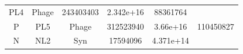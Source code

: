 \documentclass[]{article}
\begin{document}
\begin{longtable}[]{@{}cccccc@{}}
\begin{minipage}[t]{0.07\columnwidth}
PL4
\strut\end{minipage} &
\begin{minipage}[t]{0.12\columnwidth}\centering\strut
Phage
\strut\end{minipage} &
\begin{minipage}[t]{0.12\columnwidth}\centering\strut
243403403
\strut\end{minipage} &
\begin{minipage}[t]{0.12\columnwidth}\centering\strut
2.342e+16
\strut\end{minipage} &
\begin{minipage}[t]{0.12\columnwidth}\centering\strut
88361764
\strut\end{minipage}\tabularnewline
\begin{minipage}[t]{0.07\columnwidth}\centering\strut
P
\strut\end{minipage} &
\begin{minipage}[t]{0.07\columnwidth}\centering\strut
PL5
\strut\end{minipage} &
\begin{minipage}[t]{0.12\columnwidth}\centering\strut
Phage
\strut\end{minipage} &
\begin{minipage}[t]{0.12\columnwidth}\centering\strut
312523940
\strut\end{minipage} &
\begin{minipage}[t]{0.12\columnwidth}\centering\strut
3.66e+16
\strut\end{minipage} &
\begin{minipage}[t]{0.12\columnwidth}\centering\strut
110450827
\strut\end{minipage}\tabularnewline
\begin{minipage}[t]{0.07\columnwidth}\centering\strut
N
\strut\end{minipage} &
\begin{minipage}[t]{0.07\columnwidth}\centering\strut
NL2
\strut\end{minipage} &
\begin{minipage}[t]{0.12\columnwidth}\centering\strut
Syn
\strut\end{minipage} &
\begin{minipage}[t]{0.12\columnwidth}\centering\strut
17594096
\strut\end{minipage} &
\begin{minipage}[t]{0.12\columnwidth}\centering\strut
4.371e+14
\strut\end{minipage} &
\begin{minipage}[t]{0.12\columnwidth}\centering\strut

\end{minipage}
\end{longtable}
\end{document}
